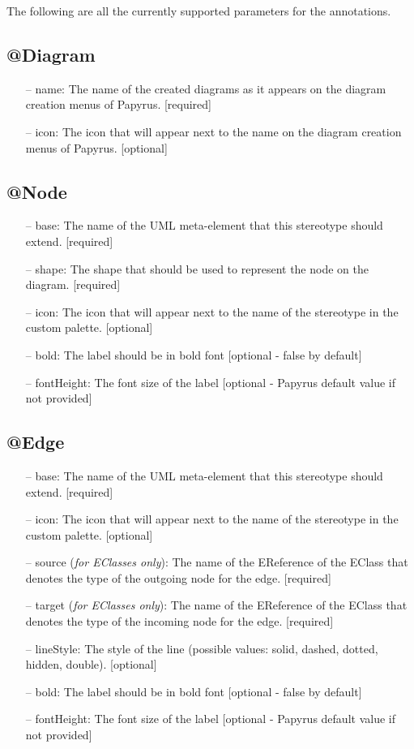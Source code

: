 \label{appendixA}
The following are all the currently supported parameters for the annotations.

\subsection{@Diagram}
\begin{itemize}
	\item[--] name: The name of the created diagrams as it appears on the diagram creation menus of Papyrus. [required]
	\item[--] icon: The icon that will appear next to the name on the diagram creation menus of Papyrus. [optional]
\end{itemize}

\subsection{@Node}
\begin{itemize}
	\item[--] base: The name of the UML meta-element that this stereotype should extend. [required]
	\item[--] shape: The shape that should be used to represent the node on the diagram. [required]		
	\item[--] icon: The icon that will appear next to the name of the stereotype in the custom palette. [optional]
	\item[--] bold: The label should be in bold font [optional - false by default]		
	\item[--] fontHeight: The font size of the label [optional - Papyrus default value if not provided]
\end{itemize}

\subsection{@Edge}
\begin{itemize}
	\item[--] base: The name of the UML meta-element that this stereotype should extend. [required]
	\item[--] icon: The icon that will appear next to the name of the stereotype in the custom palette. [optional]
	\item[--] source (\textit{for EClasses only}): The name of the EReference of the EClass that denotes the type of the outgoing node for the edge. [required]
	\item[--] target (\textit{for EClasses only}): The name of the EReference of the EClass that denotes the type of the incoming node for the edge. [required]
	\item[--] lineStyle: The style of the line (possible values: solid, dashed, dotted, hidden, double). [optional]
	\item[--] bold: The label should be in bold font [optional - false by default]		
	\item[--] fontHeight: The font size of the label [optional - Papyrus default value if not provided]
\end{itemize}
